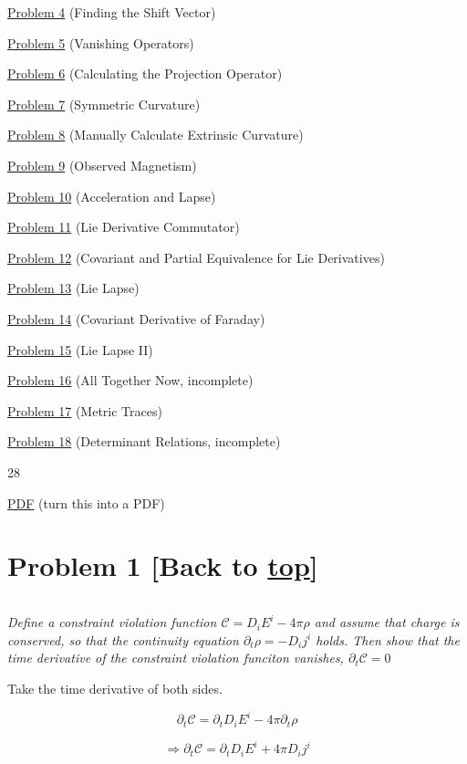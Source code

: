 \documentclass[landscape,letterpaper,10pt,english]{article}
\begin{document}
\hyperref[p4]{Problem 4} (Finding the Shift Vector)

\hyperref[p5]{Problem 5} (Vanishing Operators)

\hyperref[p6]{Problem 6} (Calculating the Projection Operator)

\hyperref[p7]{Problem 7} (Symmetric Curvature)

\hyperref[p8]{Problem 8} (Manually Calculate Extrinsic Curvature)

\hyperref[p9]{Problem 9} (Observed Magnetism)

\hyperref[p10]{Problem 10} (Acceleration and Lapse)

\hyperref[p11]{Problem 11} (Lie Derivative Commutator)

\hyperref[p12]{Problem 12} (Covariant and Partial Equivalence for Lie
Derivatives)

\hyperref[p13]{Problem 13} (Lie Lapse)

\hyperref[p14]{Problem 14} (Covariant Derivative of Faraday)

\hyperref[p15]{Problem 15} (Lie Lapse II)

\hyperref[p16]{Problem 16} (All Together Now, incomplete)

\hyperref[p17]{Problem 17} (Metric Traces)

\hyperref[p18]{Problem 18} (Determinant Relations, incomplete)

28

\hyperref[latex_pdf_output]{PDF} (turn this into a PDF)

    \hypertarget{problem-1-back-to-top}{%
\section{\texorpdfstring{Problem 1 {[}Back to
\hyperref[toc]{top}{]}}{Problem 1 {[}Back to {]}}}\label{problem-1-back-to-top}}

\[\label{P1}\]

\emph{Define a constraint violation function
\(\mathcal{C} = D_iE^i - 4\pi\rho\) and assume that charge is conserved,
so that the continuity equation \(\partial_t \rho = -D_ij^i\) holds.
Then show that the time derivative of the constraint violation funciton
vanishes, \(\partial_t \mathcal{C} = 0\)}

    Take the time derivative of both sides.

\[ \partial_t \mathcal C = \partial_t D_i E^i - 4\pi \partial_t \rho \]

\[ \Rightarrow \partial_t \mathcal C = \partial_t D_i E^i + 4\pi D_i j^i \]
\end{document}
